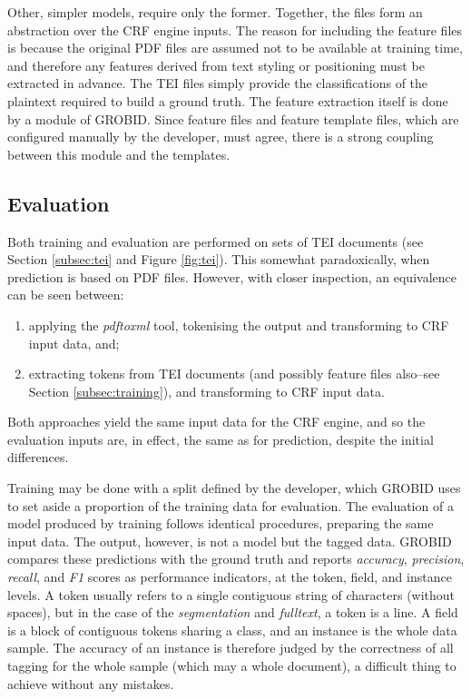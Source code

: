 Other, simpler models, require only the former. Together, the files form an abstraction over the CRF engine inputs. The reason for including the feature files is because the original PDF files are assumed not to be available at training time, and therefore any features derived from text styling or positioning must be extracted in advance. The TEI files simply provide the classifications of the plaintext required to build a ground truth. The feature extraction itself is done by a module of GROBID. Since feature files and feature template files, which are configured manually by the developer, must agree, there is a strong coupling between this module and the templates.

\subsection{Evaluation}

Both training and evaluation are performed on sets of TEI documents (see Section \ref{subsec:tei} and Figure \ref{fig:tei}). This somewhat paradoxically, when prediction is based on PDF files. However, with closer inspection, an equivalence can be seen between:

\begin{enumerate}
\item applying the \emph{pdftoxml} tool, tokenising the output and transforming to CRF input data, and;
\item extracting tokens from TEI documents (and possibly feature files also--see Section \ref{subsec:training}), and transforming to CRF input data.
\end{enumerate}

Both approaches yield the same input data for the CRF engine, and so the evaluation inputs are, in effect, the same as for prediction, despite the initial differences.

Training may be done with a split defined by the developer, which GROBID uses to set aside a proportion of the training data for evaluation. The evaluation of a model produced by training follows identical procedures, preparing the same input data. The output, however, is not a model but the tagged data. GROBID compares these predictions with the ground truth and reports \emph{accuracy}, \emph{precision}, \emph{recall}, and \emph{F1} scores as performance indicators, at the token, field, and instance levels. A token usually refers to a single contiguous string of characters (without spaces), but in the case of the \emph{segmentation} and \emph{fulltext}, a token is a line. A field is a block of contiguous tokens sharing a class, and an instance is the whole data sample. The accuracy of an instance is therefore judged by the correctness of all tagging for the whole sample (which may a whole document), a difficult thing to achieve without any mistakes.

